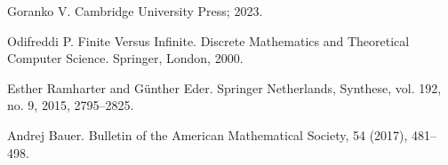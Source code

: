 \documentclass[openany]{book}
\theoremstyle{plain}
\theoremstyle{definition}
\begin{document}
\begin{thebibliography}{2}
    Goranko V.
    \newblock Cambridge University Press; 2023.

    Odifreddi P.
    \newblock Finite Versus Infinite. Discrete Mathematics and Theoretical Computer Science. Springer, London, 2000.

    Esther Ramharter and G\"{u}nther Eder.
    \newblock Springer Netherlands, Synthese, vol. 192, no. 9, 2015, 2795--2825.

    Andrej Bauer.
    \newblock Bulletin of the American Mathematical Society, 54 (2017), 481--498. 

\end{thebibliography}
\end{document}

